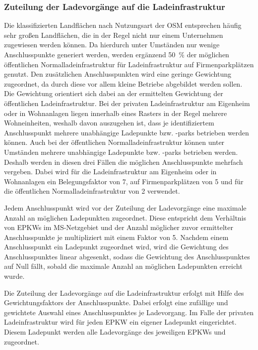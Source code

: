 \subsubsection{Zuteilung der Ladevorgänge auf die Ladeinfrastruktur}

Die klassifizierten Landflächen nach Nutzungsart der \gls{OSM} entsprechen häufig sehr großen Landflächen, die in der Regel nicht nur einem Unternehmen zugewiesen werden können.
Da hierdurch unter Umständen nur wenige Anschlusspunkte generiert werden, werden ergänzend \SI{50}{\percent} der möglichen öffentlichen Normalladeinfrastruktur für Ladeinfrastruktur auf Firmenparkplätzen genutzt.
Den zusätzlichen Anschlusspunkten wird eine geringe Gewichtung zugeordnet, da durch diese vor allem kleine Betriebe abgebildet werden sollen.
Die Gewichtung orientiert sich dabei an der ermittelten Gewichtung der öffentlichen Ladeinfrastruktur.
Bei der privaten Ladeinfrastruktur am Eigenheim oder in Wohnanlagen liegen innerhalb eines Rasters in der Regel mehrere Wohneinheiten, weshalb davon auszugehen ist, dass je identifiziertem Anschlusspunkt mehrere unabhängige Ladepunkte bzw. -parks betrieben werden können.
Auch bei der öffentlichen Normalladeinfrastruktur können unter Umständen mehrere unabhängige Ladepunkte bzw. -parks betrieben werden.
Deshalb werden in diesen drei Fällen die möglichen Anschlusspunkte mehrfach vergeben.
Dabei wird für die Ladeinfrastruktur am Eigenheim oder in Wohnanlagen ein Belegungsfaktor von \num{7}, auf Firmenparkplätzen von \num{5} und für die öffentlichen Normalladeinfrastruktur von \num{2} verwendet.\medskip

Jedem Anschlusspunkt wird vor der Zuteilung der Ladevorgänge eine maximale Anzahl an möglichen Ladepunkten zugeordnet.
Diese entspricht dem Verhältnis von \glspl{EPKW} im \gls{MS}-Netzgebiet und der Anzahl möglicher zuvor ermittelter Anschlusspunkte je \UC multipliziert mit einem Faktor von \num{5}.
Nachdem einem Anschlusspunkt ein Ladepunkt zugeordnet wird, wird die Gewichtung des Anschlusspunktes linear abgesenkt, sodass die Gewichtung des Anschlusspunktes auf Null fällt, sobald die maximale Anzahl an möglichen Ladepunkten erreicht wurde.\medskip

Die Zuteilung der Ladevorgänge auf die Ladeinfrastruktur erfolgt mit Hilfe des Gewichtungsfaktors der Anschlusspunkte.
Dabei erfolgt eine zufällige und gewichtete Auswahl eines Anschlusspunktes je Ladevorgang.
Im Falle der privaten Ladeinfrastruktur wird für jeden \gls{EPKW} ein eigener Ladepunkt eingerichtet.
Diesem Ladepunkt werden alle Ladevorgänge des jeweiligen \glspl{EPKW} und \UC zugeordnet.\medskip

